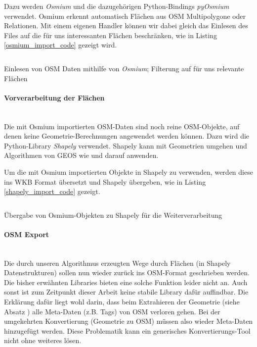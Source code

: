 Dazu werden \emph{Osmium} und die dazugehörigen Python-Bindings \emph{pyOsmium}\cite{pyosmium} verwendet. Osmium erkennt automatisch Flächen aus \ac{OSM} Multipolygone oder Relationen. Mit einem eigenen Handler können wir dabei gleich das Einlesen des Files auf die für uns interessanten Flächen beschränken, wie in Listing \ref{osmium_import_code} gezeigt wird.

\begin{listing}[ht]
    \inputminted{python}{projectdoc/listing/osmium_handler.py}
    \caption[Einlesen OSM-Daten mit Osmium]{Einlesen von OSM Daten mithilfe von \emph{Osmium}; Filterung auf für uns relevante Flächen}
    \label{osmium_import_code}
\end{listing}

\paragraph{Vorverarbeitung der Flächen}\label{par:Vorverarbeitung der Flächen}~\\
Die mit Osmium importierten \ac{OSM}-Daten sind noch reine \ac{OSM}-Objekte, auf denen keine Geometrie-Berechnungen angewendet werden können. Dazu wird die Python-Library \emph{Shapely}\cite{shapely} verwendet. Shapely kann mit Geometrien umgehen und Algorithmen von \ac{GEOS} wie  und  darauf anwenden.

Um die mit Osmium importierten Objekte in Shapely zu verwenden, werden diese ins \ac{WKB} Format übersetzt und Shapely übergeben, wie in Listing \ref{shapely_import_code} gezeigt.

\begin{listing}[ht]
    \inputminted{python}{projectdoc/listing/shapely_import.py}
    \caption[Einlesen OSM Objekte in Shapely]{Übergabe von Osmium-Objekten zu Shapely für die Weiterverarbeitung}
    \label{shapely_import_code}
\end{listing}

\paragraph{OSM Export}~\\
Die durch unseren Algorithmus erzeugten Wege durch Flächen (in Shapely Datenstrukturen) sollen nun wieder zurück ins \ac{OSM}-Format geschrieben werden. Die bisher erwähnten Libraries bieten eine solche Funktion leider nicht an. Auch sonst ist zum Zeitpunkt dieser Arbeit keine stabile Library dafür auffindbar. Die Erklärung dafür liegt wohl darin, dass beim Extrahieren der Geometrie (siehe Absatz ) alle Meta-Daten (z.B. Tags) von \ac{OSM} verloren gehen. Bei der umgekehrten Konvertierung (Geometrie zu \ac{OSM}) müssen also wieder Meta-Daten hinzugefügt werden. Diese Problematik kann ein generisches Konvertierungs-Tool nicht ohne weiteres lösen.

